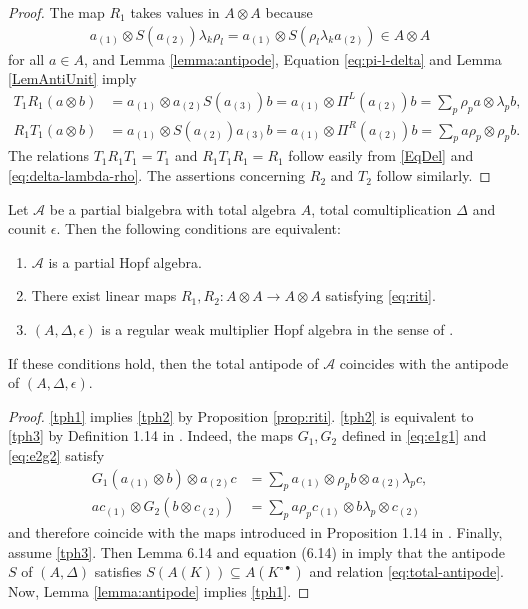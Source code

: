 \begin{proof}
  The map $R_{1}$ takes values in $A\otimes A$ because
  \begin{align*}
  a_{(1)} \otimes
  S(a_{(2)})\lambda_{k}\rho_{l} =  a_{(1)} \otimes S(\rho_{l}\lambda_{k}a_{(2)}) \in A
  \otimes A
  \end{align*}
  for all $a\in A$, and Lemma
  \ref{lemma:antipode},  Equation \eqref{eq:pi-l-delta} and Lemma \ref{LemAntiUnit} imply
  \begin{align*}
    T_{1}R_{1}(a \otimes b)&= a_{(1)} \otimes a_{(2)}S(a_{(3)})b =
    a_{(1)} \otimes \Pi^{L}(a_{(2)})b =
    \sum_{p} \rho_{p}a \otimes \lambda_{p}b, \\
    R_{1}T_{1}(a \otimes b) &= a_{(1)} \otimes S(a_{(2)})a_{(3)}b =
    a_{(1)} \otimes \Pi^{R}(a_{(2)})b = \sum_{p} a\rho_{p}\otimes
    \rho_{p}b.
  \end{align*}
 The relations $T_{1}R_{1}T_{1}=T_{1}$ and
$R_{1}T_{1}R_{1}=R_{1}$ follow easily from  \eqref{EqDel} and
\eqref{eq:delta-lambda-rho}. The assertions concerning $R_{2}$ and
$T_{2}$ follow similarly.
\end{proof}
\begin{Theorem}  \label{theorem:partial-hopf-algebra}
  Let $\mathscr{A}$ be a partial bialgebra with total algebra $A$,
  total comultiplication $\Delta$ and counit $\epsilon$. Then the
  following conditions are equivalent:
  \begin{enumerate}[label={(\arabic*)}]
  \item\label{tph1} $\mathscr{A}$ is a partial Hopf algebra.
  \item\label{tph2} There exist linear maps $R_{1},R_{2} \colon A\otimes A\to
    A\otimes A$ satisfying  \eqref{eq:riti}.
  \item\label{tph3} $(A,\Delta,\epsilon)$  is a regular weak multiplier Hopf algebra in the sense of \cite{VDW1}.
  \end{enumerate}
  If these conditions hold, then the total  antipode of $\mathscr{A}$ coincides with the antipode of $(A,\Delta,\epsilon)$.
\end{Theorem}
\begin{proof}
\ref{tph1} implies \ref{tph2} by Proposition \ref{prop:riti}. \ref{tph2} is equivalent to \ref{tph3} by Definition
1.14 in \cite{VDW1}. Indeed, the maps $G_{1},G_{2}$ defined in \eqref{eq:e1g1} and \eqref{eq:e2g2} satisfy
\begin{align*}
  G_{1}(a_{(1)} \otimes b) \otimes a_{(2)}c &= \sum_{p} a_{(1)} \otimes \rho_{p}b
  \otimes a_{(2)}\lambda_{p}c, \\
  ac_{(1)} \otimes G_{2}(b\otimes c_{(2)}) &=\sum_{p} a\rho_{p}c_{(1)} \otimes b\lambda_{p} \otimes c_{(2)}
\end{align*}
and therefore coincide with the maps introduced in Proposition 1.14 in
\cite{VDW1}.  Finally, assume \ref{tph3}. Then
 Lemma 6.14 and equation (6.14) in \cite{Boh1} imply that the antipode
$S$ of $(A,\Delta)$ satisfies $S(A(K))\subseteq A(K^{\circ\bullet})$ and relation \eqref{eq:total-antipode}.  Now, Lemma \ref{lemma:antipode} implies \ref{tph1}.
\end{proof}

